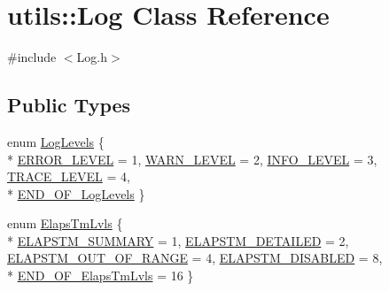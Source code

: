 \hypertarget{classutils_1_1Log}{}\section{utils\+:\+:Log Class Reference}
\label{classutils_1_1Log}


{\ttfamily \#include $<$Log.\+h$>$}

\subsection*{Public Types}
\begin{DoxyCompactItemize}
\item 
enum \hyperlink{classutils_1_1Log_a8f981afda2b7802a6e9ca4aac269d54a}{Log\+Levels} \{ \\*
\hyperlink{classutils_1_1Log_a8f981afda2b7802a6e9ca4aac269d54aaa3a7218440adf6d603dcaceabb683a12}{E\+R\+R\+O\+R\+\_\+\+L\+E\+V\+EL} = 1, 
\hyperlink{classutils_1_1Log_a8f981afda2b7802a6e9ca4aac269d54aac494c60808c9ca13881edb977d888127}{W\+A\+R\+N\+\_\+\+L\+E\+V\+EL} = 2, 
\hyperlink{classutils_1_1Log_a8f981afda2b7802a6e9ca4aac269d54aa9c80ebf03876dd47244938a0d60631a5}{I\+N\+F\+O\+\_\+\+L\+E\+V\+EL} = 3, 
\hyperlink{classutils_1_1Log_a8f981afda2b7802a6e9ca4aac269d54aa023731e6ba36eed6733acfa4e182dc85}{T\+R\+A\+C\+E\+\_\+\+L\+E\+V\+EL} = 4, 
\\*
\hyperlink{classutils_1_1Log_a8f981afda2b7802a6e9ca4aac269d54aab0e7af85fa3d909da693e83b540ac2a3}{E\+N\+D\+\_\+\+O\+F\+\_\+\+Log\+Levels}
 \}
\item 
enum \hyperlink{classutils_1_1Log_aeb031aea7d8d59f98a6857915d32e864}{Elaps\+Tm\+Lvls} \{ \\*
\hyperlink{classutils_1_1Log_aeb031aea7d8d59f98a6857915d32e864ac2b82d02aa2ddf29cc1e3f5385644267}{E\+L\+A\+P\+S\+T\+M\+\_\+\+S\+U\+M\+M\+A\+RY} = 1, 
\hyperlink{classutils_1_1Log_aeb031aea7d8d59f98a6857915d32e864a14889f3c1fee759c05748d57ffe33798}{E\+L\+A\+P\+S\+T\+M\+\_\+\+D\+E\+T\+A\+I\+L\+ED} = 2, 
\hyperlink{classutils_1_1Log_aeb031aea7d8d59f98a6857915d32e864a35b8d83c7001e838bdab3500441becd8}{E\+L\+A\+P\+S\+T\+M\+\_\+\+O\+U\+T\+\_\+\+O\+F\+\_\+\+R\+A\+N\+GE} = 4, 
\hyperlink{classutils_1_1Log_aeb031aea7d8d59f98a6857915d32e864ae1ccab5063c41d5d18e2cd7535a55983}{E\+L\+A\+P\+S\+T\+M\+\_\+\+D\+I\+S\+A\+B\+L\+ED} = 8, 
\\*
\hyperlink{classutils_1_1Log_aeb031aea7d8d59f98a6857915d32e864ad1c7a76ee5bd172473f5018c310d9eaa}{E\+N\+D\+\_\+\+O\+F\+\_\+\+Elaps\+Tm\+Lvls} = 16
 \}
\item 

\end{DoxyCompactItemize}
